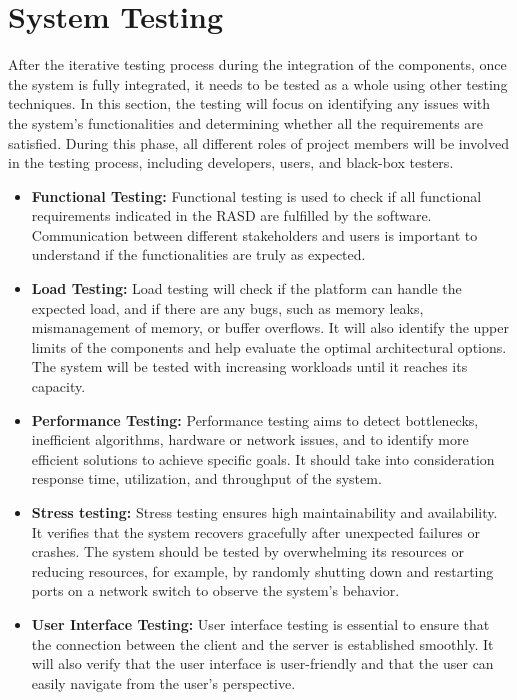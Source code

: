 \section{System Testing}\label{sec:testing-plan}
After the iterative testing process during the integration of the components, once the system is fully integrated, it needs to be tested as a whole
 using other testing techniques. In this section, the testing will focus on identifying any issues with the system's functionalities and determining 
 whether all the requirements are satisfied. During this phase, all different roles of project members will be involved in the testing process, 
 including developers, users, and black-box testers.
    \begin{itemize}
        \item \textbf{Functional Testing:} Functional testing is used to check if all functional requirements indicated in the RASD are fulfilled by 
        the software. Communication between different stakeholders and users is important to understand if the functionalities are truly as expected. 
        \item \textbf{Load Testing:} Load testing will check if the platform can handle the expected load, and if there are any bugs, such as memory 
        leaks, mismanagement of memory, or buffer overflows. It will also identify the upper limits of the components and help evaluate the optimal 
        architectural options. The system will be tested with increasing workloads until it reaches its capacity.
        \item \textbf{Performance Testing:} Performance testing aims to detect bottlenecks, inefficient algorithms, hardware or network issues, and
         to identify more efficient solutions to achieve specific goals. It should take into consideration response time, utilization, and 
         throughput of the system.
        \item \textbf{Stress testing:} Stress testing ensures high maintainability and availability. It verifies that the system recovers gracefully 
        after unexpected failures or crashes. The system should be tested by overwhelming its resources or reducing resources, for example, by 
        randomly shutting down and restarting ports on a network switch to observe the system's behavior.
        \item \textbf{User Interface Testing:} User interface testing is essential to ensure that the connection between the client and the server
        is established smoothly. It will also verify that the user interface is user-friendly and that the user can easily navigate from the user's
        perspective.
    \end{itemize}


